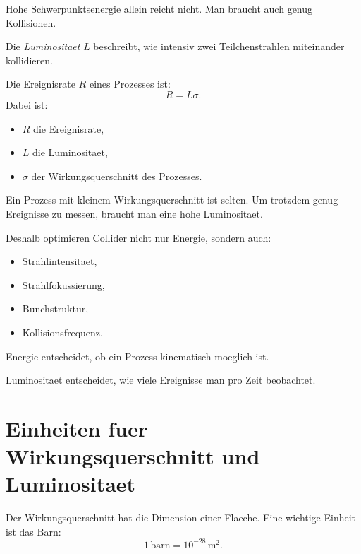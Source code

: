 Hohe Schwerpunktsenergie allein reicht nicht.
Man braucht auch genug Kollisionen.

\begin{definitionbox}
Die \emph{Luminositaet} $L$ beschreibt, wie intensiv zwei Teilchenstrahlen miteinander
kollidieren.
\end{definitionbox}

\begin{formulabox}
Die Ereignisrate $R$ eines Prozesses ist:
\[
    R = L\sigma.
\]
Dabei ist:
\begin{itemize}
    \item $R$ die Ereignisrate,
    \item $L$ die Luminositaet,
    \item $\sigma$ der Wirkungsquerschnitt des Prozesses.
\end{itemize}
\end{formulabox}

\begin{conceptbox}
Ein Prozess mit kleinem Wirkungsquerschnitt ist selten.
Um trotzdem genug Ereignisse zu messen, braucht man eine hohe Luminositaet.

Deshalb optimieren Collider nicht nur Energie, sondern auch:
\begin{itemize}
    \item Strahlintensitaet,
    \item Strahlfokussierung,
    \item Bunchstruktur,
    \item Kollisionsfrequenz.
\end{itemize}
\end{conceptbox}

\begin{examtipbox}
Energie entscheidet, ob ein Prozess kinematisch moeglich ist.

Luminositaet entscheidet, wie viele Ereignisse man pro Zeit beobachtet.
\end{examtipbox}

\section{Einheiten fuer Wirkungsquerschnitt und Luminositaet}

\begin{definitionbox}
Der Wirkungsquerschnitt hat die Dimension einer Flaeche.
Eine wichtige Einheit ist das Barn:
\[
    1\,\mathrm{barn}=10^{-28}\,\mathrm{m^2}.
\]
\end{definitionbox}

